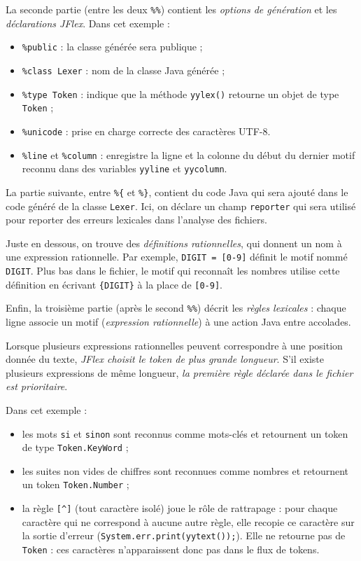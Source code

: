 \documentclass{td}
\begin{document}
\begin{exercice}
  La seconde partie (entre les deux \lstinline|%%|)
  contient les \emph{options de génération} et les \emph{déclarations JFlex}.
  Dans cet exemple :
  \begin{itemize}
  \item \texttt{\%public} :
    la classe générée sera publique ;
  \item \texttt{\%class Lexer} :
    nom de la classe Java générée ;
  \item \texttt{\%type Token} :
    indique que la méthode \lstinline|yylex()| retourne un objet de type \texttt{Token} ;
  \item \texttt{\%unicode} :
    prise en charge correcte des caractères UTF-8.
  \item \texttt{\%line} et \texttt{\%column} :
    enregistre la ligne et la colonne du début du dernier motif reconnu dans des variables \texttt{yyline} et \texttt{yycolumn}.
  \end{itemize}

  La partie suivante, entre \texttt{\%\{} et \texttt{\%\}}, contient du code Java qui sera
  ajouté dans le code généré de la classe \texttt{Lexer}. Ici, on déclare un champ \texttt{reporter}
  qui sera utilisé pour reporter des erreurs lexicales dans l'analyse des fichiers.
  
  Juste en dessous, on trouve des \emph{définitions rationnelles}, qui donnent un nom
  à une expression rationnelle. Par exemple,
  \lstinline|DIGIT = [0-9]|
  définit le motif nommé \lstinline|DIGIT|. Plus bas dans le fichier,
  le motif qui reconnaît les nombres utilise cette définition en écrivant
  \lstinline|{DIGIT}| à la place de \lstinline|[0-9]|.

  Enfin, la troisième partie (après le second \lstinline|%%|)
  décrit les \emph{règles lexicales} : chaque ligne associe un motif
  (\emph{expression rationnelle}) à une action Java entre accolades.

  Lorsque plusieurs expressions rationnelles peuvent correspondre
  à une position donnée du texte, \emph{JFlex choisit le token de plus grande longueur}.
  S'il existe plusieurs expressions de même longueur,
  \emph{la première règle déclarée dans le fichier est prioritaire}.

  Dans cet exemple :
  \begin{itemize}
  \item les mots \texttt{si} et \texttt{sinon} sont reconnus comme mots-clés
    et retournent un token de type \texttt{Token.KeyWord} ;
  \item les suites non vides de chiffres sont reconnues comme nombres
    et retournent un token \texttt{Token.Number} ;
  \item la règle \lstinline|[^]| (tout caractère isolé) joue le rôle de \og rattrapage \fg :
    pour chaque caractère qui ne correspond à aucune autre règle, elle recopie ce caractère
    sur la sortie d'erreur (\texttt{System.err.print(yytext());}).
    Elle ne retourne pas de \texttt{Token} : ces caractères n'apparaissent donc pas
    dans le flux de tokens.
  \end{itemize}
  

\end{exercice}
\end{document}
